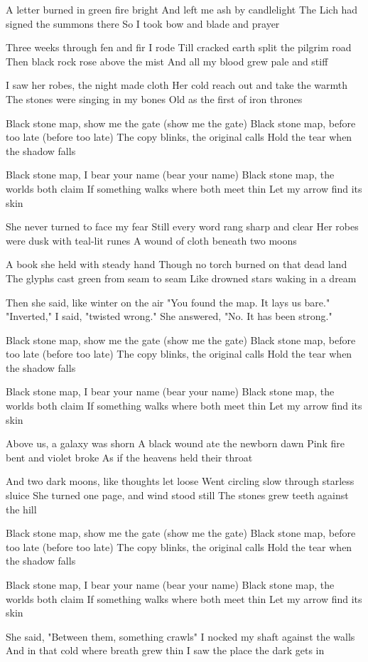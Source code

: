 \begin{lyrics}
A letter burned in green fire bright
And left me ash by candlelight
The Lich had signed the summons there
So I took bow and blade and prayer

Three weeks through fen and fir I rode
Till cracked earth split the pilgrim road
Then black rock rose above the mist
And all my blood grew pale and stiff

I saw her robes, the night made cloth
Her cold reach out and take the warmth
The stones were singing in my bones
Old as the first of iron thrones

Black stone map, show me the gate (show me the gate)
Black stone map, before too late (before too late)
The copy blinks, the original calls
Hold the tear when the shadow falls

Black stone map, I bear your name (bear your name)
Black stone map, the worlds both claim
If something walks where both meet thin
Let my arrow find its skin

She never turned to face my fear
Still every word rang sharp and clear
Her robes were dusk with teal-lit runes
A wound of cloth beneath two moons

A book she held with steady hand
Though no torch burned on that dead land
The glyphs cast green from seam to seam
Like drowned stars waking in a dream

Then she said, like winter on the air
"You found the map. It lays us bare."
"Inverted," I said, "twisted wrong."
She answered, "No. It has been strong."

Black stone map, show me the gate (show me the gate)
Black stone map, before too late (before too late)
The copy blinks, the original calls
Hold the tear when the shadow falls

Black stone map, I bear your name (bear your name)
Black stone map, the worlds both claim
If something walks where both meet thin
Let my arrow find its skin

Above us, a galaxy was shorn
A black wound ate the newborn dawn
Pink fire bent and violet broke
As if the heavens held their throat

And two dark moons, like thoughts let loose
Went circling slow through starless sluice
She turned one page, and wind stood still
The stones grew teeth against the hill

Black stone map, show me the gate (show me the gate)
Black stone map, before too late (before too late)
The copy blinks, the original calls
Hold the tear when the shadow falls

Black stone map, I bear your name (bear your name)
Black stone map, the worlds both claim
If something walks where both meet thin
Let my arrow find its skin

She said, "Between them, something crawls"
I nocked my shaft against the walls
And in that cold where breath grew thin
I saw the place the dark gets in
\end{lyrics}

